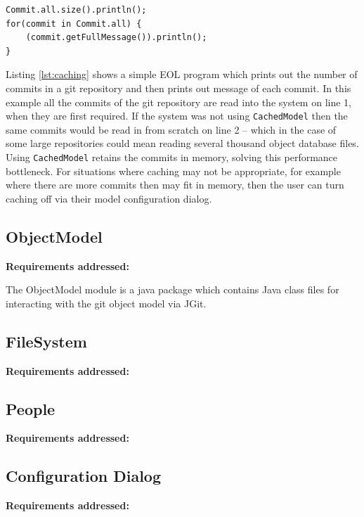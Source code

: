 \documentclass[11pt]{book}
\newcommand{\code}[1]{\texttt{#1}}
\begin{document}
\begin{lstlisting}[caption=EOL Code benefiting from caching, label=lst:caching]
Commit.all.size().println();
for(commit in Commit.all) {
	(commit.getFullMessage()).println();
}
\end{lstlisting}

Listing \ref{lst:caching} shows a simple EOL program which prints out the number of commits in a git repository and then prints out message of each commit. In this example all the commits of the git repository are read into the system on line 1, when they are first required. If the system was not using \code{CachedModel} then the same commits would be read in from scratch on line 2 -- which in the case of some large repositories could mean reading several thousand object database files. Using \code{CachedModel} retains the commits in memory, solving this performance bottleneck. For situations where caching may not be appropriate, for example where there are more commits then may fit in memory, then the user can turn caching off via their model configuration dialog.



\subsection{ObjectModel}
\begin{tcolorbox}
\textbf{Requirements addressed:}
\end{tcolorbox}

The ObjectModel module is a java package which contains Java class files for interacting with the git object model via JGit. 

\subsection{FileSystem}
\begin{tcolorbox}
\textbf{Requirements addressed:}
\end{tcolorbox}

\subsection{People}
\begin{tcolorbox}
\textbf{Requirements addressed:}
\end{tcolorbox}

\subsection{Configuration Dialog}
\begin{tcolorbox}
\textbf{Requirements addressed:}
\end{tcolorbox}
\end{document}
